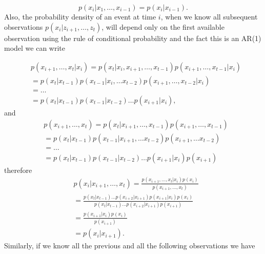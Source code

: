 \begin{equation*}
    p(x_i | x_1, \dots, x_{i-1}) = p(x_i | x_{i-1}).   
\end{equation*}
Also, the probability density of an event at time $i$, when we know all subsequent observations $p(x_i | z_{i+1}, \dots, z_t)$, will depend only on the first available observation using the rule of conditional probability and the fact this is an AR(1) model we can write

\begin{align*}
    &p(x_{i+1}, \dots, x_t | x_i) = p(x_t | x_i, x_{i+1}, \dots, x_{t-1}) p(x_{i+1}, \dots, x_{t-1} | x_i)\\
    &= p(x_t | x_{t-1}) p(x_{t-1} | x_i, \dots x_{t-2}) p(x_{i+1}, \dots, x_{t-2} | x_i)\\
    &= \dots\\
    &= p(x_t | x_{t-1})p(x_{t-1} | x_{t-2}) \dots p(x_{i+1} | x_i),
\end{align*}
and
\begin{align*}
    &p(x_{i+1}, \dots, x_t) = p(x_t | x_{i+1}, \dots, x_{t-1}) p(x_{i+1}, \dots, x_{t-1})\\
    &= p(x_t | x_{t-1}) p(x_{t-1} | x_{i+1}, \dots x_{t-2}) p(x_{i+1}, \dots x_{t-2})\\
    &= \dots\\
    &= p(x_t | x_{t-1})p(x_{t-1} | x_{t-2}) \dots p(x_{i+1} | x_i) p(x_{i+1})
\end{align*}
therefore
\begin{align*}
    &p(x_i | x_{i+1}, \dots, x_t) = \frac{p(x_{i+1},\dots, x_t | x_i) p(x_i)}{p(x_{i+1}, \dots, x_t)}\\
    &= \frac{p(x_t | x_{t-1})\dots p(x_{i+2} | x_{i+1}) p(x_{i+1} | x_i) p(x_i)}{p(x_t | x_{t-1})\dots p(x_{i+2} | x_{i+1}) p(x_{i+1})}\\
    &= \frac{p(x_{i+1} | x_i) p(x_i)}{p(x_{i+1})}\\
    &= p(x_i | x_{i+1}).
\end{align*}
Similarly, if we know all the previous and all the following observations we have

